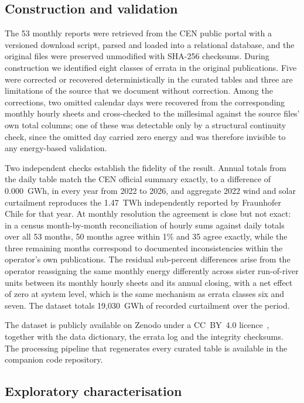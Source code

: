 \documentclass[preprint,3p,times]{elsarticle}
\providecommand{\DIFaddbegin}{} %
\providecommand{\DIFaddend}{} %
\providecommand{\DIFaddincludegraphics}[2][]{{\color{blue}\fbox{\DIFOincludegraphics[#1]{#2}}}} %
\DeclareRobustCommand{\DIFaddbegin}{\DIFOaddbegin \let\includegraphics\DIFaddincludegraphics} %
\DeclareRobustCommand{\DIFaddend}{\DIFOaddend \let\includegraphics\DIFOincludegraphics} %
\begin{document}
\subsection{Construction and validation}

The 53 monthly reports were retrieved from the CEN public portal with a versioned download script, parsed and loaded into a relational database, and the original files were preserved unmodified with SHA-256 checksums. During construction we identified eight classes of errata in the original publications. Five were corrected or recovered deterministically in the curated tables and three are limitations of the source that we document without correction. Among the corrections, two omitted calendar days were recovered from the corresponding monthly hourly sheets and cross-checked to the millesimal against the source files' own total columns; one of these was detectable only by a structural continuity check, since the omitted day carried zero energy and was therefore invisible to any energy-based validation.

Two independent checks establish the fidelity of the result. Annual totals from the daily table match the CEN official summary exactly, to a difference of 0.000~GWh, in every year from 2022 to 2026, and aggregate 2022 wind and solar curtailment reproduces the 1.47~TWh independently reported by Fraunhofer Chile for that year. At monthly resolution the agreement is close but not exact: in a census month-by-month reconciliation of hourly sums against daily totals over all 53 months, 50 months agree within 1\% and 35 agree exactly, while the three remaining months correspond to documented inconsistencies within the operator's own publications. The residual sub-percent differences arise from the operator reassigning the same monthly energy differently across sister run-of-river units between its monthly hourly sheets and its annual closing, with a net effect of zero at system level, which is the same mechanism as errata classes six and seven. The dataset totals 19{,}030~GWh of recorded curtailment over the period.

The dataset is publicly available on Zenodo under a CC~BY~4.0 licence~\cite{dataset2026}, together with the data dictionary, the errata log and the integrity checksums. The processing pipeline that regenerates every curated table is available in the companion code repository.

\subsection{Exploratory characterisation}
\DIFaddbegin \label{sec:eda}
\DIFaddend 
\end{document}
